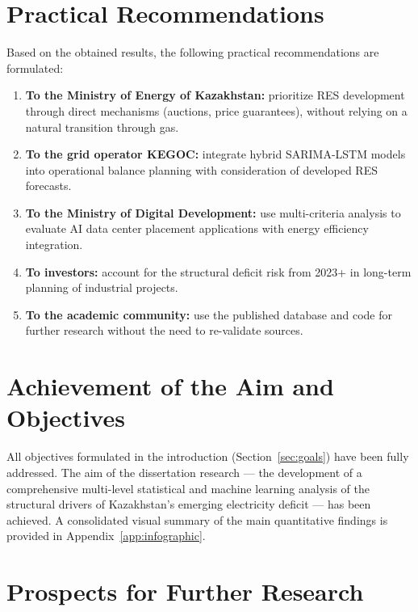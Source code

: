 \section{Practical Recommendations}
\label{sec:concl_recommendations}

Based on the obtained results, the following practical recommendations are formulated:

\begin{enumerate}
    \item \textbf{To the Ministry of Energy of Kazakhstan:} prioritize RES development through direct mechanisms (auctions, price guarantees), without relying on a natural transition through gas.

    \item \textbf{To the grid operator KEGOC:} integrate hybrid SARIMA-LSTM models into operational balance planning with consideration of developed RES forecasts.

    \item \textbf{To the Ministry of Digital Development:} use multi-criteria analysis to evaluate AI data center placement applications with energy efficiency integration.

    \item \textbf{To investors:} account for the structural deficit risk from 2023+ in long-term planning of industrial projects.

    \item \textbf{To the academic community:} use the published database and code for further research without the need to re-validate sources.
\end{enumerate}

\section{Achievement of the Aim and Objectives}
\label{sec:concl_goals}

All objectives formulated in the introduction (Section~\ref{sec:goals}) have been fully addressed. The aim of the dissertation research --- the development of a comprehensive multi-level statistical and machine learning analysis of the structural drivers of Kazakhstan's emerging electricity deficit --- has been achieved. A consolidated visual summary of the main quantitative findings is provided in Appendix~\ref{app:infographic}.

\section{Prospects for Further Research}
\label{sec:concl_future}

